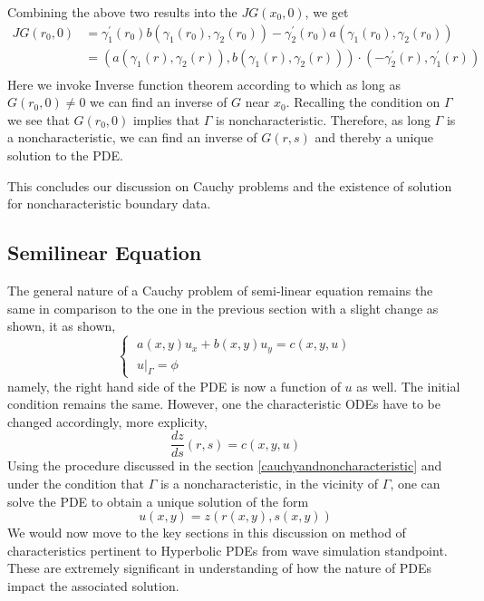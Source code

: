 \documentclass[11pt, a4paper]{report}
\begin{document}
Combining the above two results into the $JG(x_0, 0)$, we get
\begin{equation*}
    \begin{split}
        JG\left(r_{0}, 0\right) & = \gamma_{1}^{\prime}\left(r_{0}\right)b\left(\gamma_{1}\left(r_{0}\right), \gamma_{2}\left(r_{0}\right)\right) - \gamma_{2}^{\prime}\left(r_{0}\right) a\left(\gamma_{1}\left(r_{0}\right), \gamma_{2}\left(r_{0}\right)\right) \\
            & = \left(a\left(\gamma_{1}(r), \gamma_{2}(r)\right), b\left(\gamma_{1}(r), \gamma_{2}(r) \right)\right) \cdot \left(-\gamma_{2}^{\prime}(r), \gamma_{1}^{\prime}(r)\right) \\
    \end{split}
\end{equation*}
Here we invoke Inverse function theorem according to which as long as $G(r_0, 0)\neq 0$ we can find an inverse
of $G$ near $x_0$. Recalling the condition on $\Gamma$ we see that $G(r_0, 0)$ implies that $\Gamma$ is 
noncharacteristic. Therefore, as long $\Gamma$ is a noncharacteristic, we can find an inverse of $G(r, s)$ and 
thereby a unique solution to the PDE. 

This concludes our discussion on Cauchy problems and the existence of solution for noncharacteristic boundary
data.

\subsection{Semilinear Equation}
The general nature of a Cauchy problem of semi-linear equation remains the same in comparison to the one in the
previous section with a slight change as shown,
it as shown,
\begin{equation*}
    \begin{cases}
        \; a(x,y)u_x + b(x,y)u_y = c(x, y, u)\\[-0.5em] %
        \; u|_\Gamma = \phi
    \end{cases}
\end{equation*}
namely, the right hand side of the PDE is now a function of $u$ as well. The initial condition remains the same. 
However, one the characteristic ODEs have to be changed accordingly, more explicity,
\begin{equation*}
    \frac {dz}{ds}(r, s) = c(x, y, u) 
\end{equation*}
Using the procedure discussed in the section \ref{cauchyandnoncharacteristic} and under the condition that $\Gamma$ 
is a noncharacteristic, in the vicinity of $\Gamma$, one can solve the PDE to obtain a unique solution of the form
\begin{equation*}
    u(x, y) = z(r(x, y), s(x, y))
\end{equation*}
We would now move to the key sections in this discussion on method of characteristics pertinent to Hyperbolic PDEs 
from wave simulation standpoint. These are extremely significant in understanding of how the nature of PDEs impact 
the associated solution. 
\end{document}
